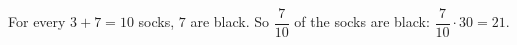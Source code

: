 For every $3+7=10$ socks, $7$ are black. So $\dfrac{7}{10}$ of the socks are black: $\dfrac{7}{10}\cdot30=\boxed{21}$.
